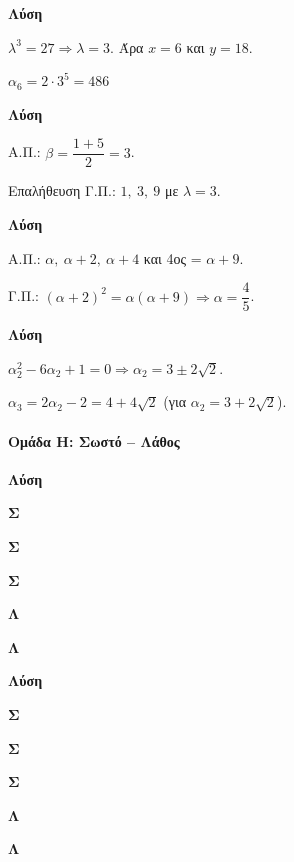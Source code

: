 \documentclass[11pt,a4paper,modern]{FFExercises}
\begin{document}
\askhsh
\textbf{Λύση}
\begin{alist}
  \item $\lambda^3 = 27 \Rightarrow \lambda = 3$. Άρα $x = 6$ και $y = 18$.
  
  \item $\alpha_6 = 2 \cdot 3^5 = 486$
\end{alist}

\askhsh
\textbf{Λύση}

Α.Π.: $\beta = \dfrac{1 + 5}{2} = 3$.

Επαλήθευση Γ.Π.: $1,\ 3,\ 9$ με $\lambda = 3$. \checkmark

\askhsh
\textbf{Λύση}

Α.Π.: $\alpha,\ \alpha+2,\ \alpha+4$ και 4ος = $\alpha + 9$.

Γ.Π.: $(\alpha+2)^2 = \alpha(\alpha+9) \Rightarrow \alpha = \dfrac{4}{5}$.

\askhsh
\textbf{Λύση}

$\alpha_2^2 - 6\alpha_2 + 1 = 0 \Rightarrow \alpha_2 = 3 \pm 2\sqrt{2}$.

$\alpha_3 = 2\alpha_2 - 2 = 4 + 4\sqrt{2}$ (για $\alpha_2 = 3 + 2\sqrt{2}$).


\paragraph{Ομάδα Η: Σωστό -- Λάθος}

\askhsh
\textbf{Λύση}
\begin{alist}
  \item \textbf{Σ}
  \item \textbf{Σ}
  \item \textbf{Σ}
  \item \textbf{Λ}
  \item \textbf{Λ}
\end{alist}

\askhsh
\textbf{Λύση}
\begin{alist}
  \item \textbf{Σ}
  \item \textbf{Σ}
  \item \textbf{Σ}
  \item \textbf{Λ}
  \item \textbf{Λ}
\end{alist}
\end{document}
